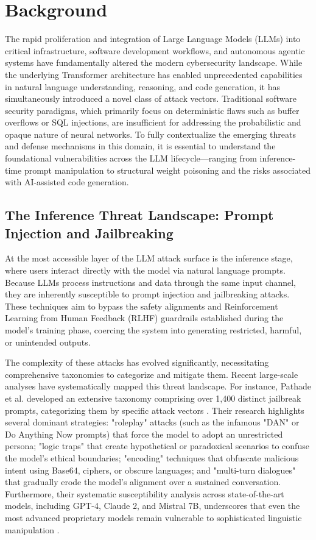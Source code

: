 \documentclass[11pt,a4paper]{article}
\begin{document}
\section{Background}

The rapid proliferation and integration of Large Language Models (LLMs) into critical infrastructure, software development workflows, and autonomous agentic systems have fundamentally altered the modern cybersecurity landscape. While the underlying Transformer architecture has enabled unprecedented capabilities in natural language understanding, reasoning, and code generation, it has simultaneously introduced a novel class of attack vectors. Traditional software security paradigms, which primarily focus on deterministic flaws such as buffer overflows or SQL injections, are insufficient for addressing the probabilistic and opaque nature of neural networks. To fully contextualize the emerging threats and defense mechanisms in this domain, it is essential to understand the foundational vulnerabilities across the LLM lifecycle---ranging from inference-time prompt manipulation to structural weight poisoning and the risks associated with AI-assisted code generation.

\subsection{The Inference Threat Landscape: Prompt Injection and Jailbreaking}

At the most accessible layer of the LLM attack surface is the inference stage, where users interact directly with the model via natural language prompts. Because LLMs process instructions and data through the same input channel, they are inherently susceptible to prompt injection and jailbreaking attacks. These techniques aim to bypass the safety alignments and Reinforcement Learning from Human Feedback (RLHF) guardrails established during the model's training phase, coercing the system into generating restricted, harmful, or unintended outputs.

The complexity of these attacks has evolved significantly, necessitating comprehensive taxonomies to categorize and mitigate them. Recent large-scale analyses have systematically mapped this threat landscape. For instance, Pathade et al. developed an extensive taxonomy comprising over 1,400 distinct jailbreak prompts, categorizing them by specific attack vectors \cite{Pathade_2025_LLMs}. Their research highlights several dominant strategies: "roleplay" attacks (such as the infamous "DAN" or Do Anything Now prompts) that force the model to adopt an unrestricted persona; "logic traps" that create hypothetical or paradoxical scenarios to confuse the model's ethical boundaries; "encoding" techniques that obfuscate malicious intent using Base64, ciphers, or obscure languages; and "multi-turn dialogues" that gradually erode the model's alignment over a sustained conversation. Furthermore, their systematic susceptibility analysis across state-of-the-art models, including GPT-4, Claude 2, and Mistral 7B, underscores that even the most advanced proprietary models remain vulnerable to sophisticated linguistic manipulation \cite{Pathade_2025_LLMs}.
\end{document}
